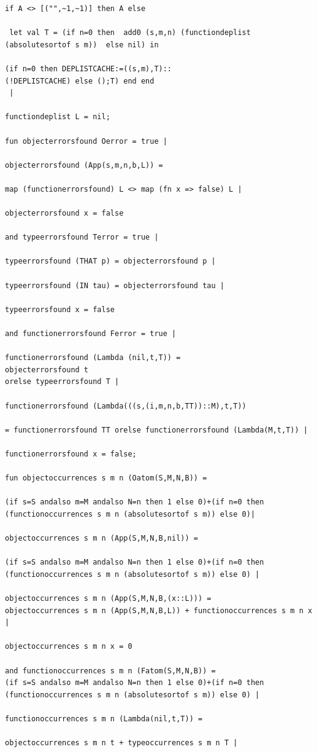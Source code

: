 \documentclass[12pt]{article}
\begin{document}
\begin{verbatim}
if A <> [("",~1,~1)] then A else

 let val T = (if n=0 then  add0 (s,m,n) (functiondeplist 
(absolutesortof s m))  else nil) in

(if n=0 then DEPLISTCACHE:=((s,m),T)::
(!DEPLISTCACHE) else ();T) end end
 |

functiondeplist L = nil;

fun objecterrorsfound Oerror = true |

objecterrorsfound (App(s,m,n,b,L)) =

map (functionerrorsfound) L <> map (fn x => false) L |

objecterrorsfound x = false 

and typeerrorsfound Terror = true |

typeerrorsfound (THAT p) = objecterrorsfound p |

typeerrorsfound (IN tau) = objecterrorsfound tau |

typeerrorsfound x = false 

and functionerrorsfound Ferror = true |

functionerrorsfound (Lambda (nil,t,T)) = 
objecterrorsfound t 
orelse typeerrorsfound T |

functionerrorsfound (Lambda(((s,(i,m,n,b,TT))::M),t,T))

= functionerrorsfound TT orelse functionerrorsfound (Lambda(M,t,T)) |

functionerrorsfound x = false;

fun objectoccurrences s m n (Oatom(S,M,N,B)) =

(if s=S andalso m=M andalso N=n then 1 else 0)+(if n=0 then
(functionoccurrences s m n (absolutesortof s m)) else 0)|

objectoccurrences s m n (App(S,M,N,B,nil)) =

(if s=S andalso m=M andalso N=n then 1 else 0)+(if n=0 then
(functionoccurrences s m n (absolutesortof s m)) else 0) |

objectoccurrences s m n (App(S,M,N,B,(x::L))) =
objectoccurrences s m n (App(S,M,N,B,L)) + functionoccurrences s m n x |

objectoccurrences s m n x = 0

and functionoccurrences s m n (Fatom(S,M,N,B)) =
(if s=S andalso m=M andalso N=n then 1 else 0)+(if n=0 then
(functionoccurrences s m n (absolutesortof s m)) else 0) |

functionoccurrences s m n (Lambda(nil,t,T)) =

objectoccurrences s m n t + typeoccurrences s m n T |


\end{verbatim}
\end{document}
